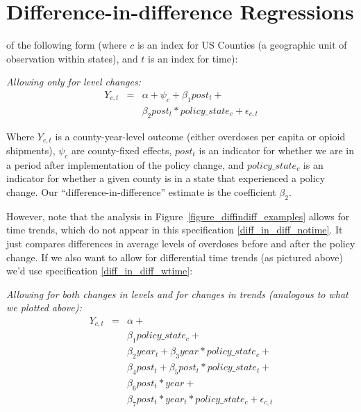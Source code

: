 \documentclass[12pt]{article}
\begin{document}
\appendix

\section{Difference-in-difference Regressions}\label{appendix_diffindiff}

of the following form (where $c$ is an index for US Counties (a geographic unit of observation within states), and $t$ is an index for time):

\emph{Allowing only for level changes:}
\begin{eqnarray}
 Y_{c,t} &=& \alpha + \psi_{c} + \beta_1 post_{t} + \label{diff_in_diff_notime}\\
  && \beta_2 post_{t} * policy\_state_{c} + \epsilon_{c,t} \nonumber
\end{eqnarray}

Where $Y_{c,t}$ is a county-year-level outcome (either overdoses per capita or opioid shipments),  $\psi_c$ are county-fixed effects, $post_{t}$ is an indicator for whether we are in a period after implementation of the policy change, and $policy\_state_{c}$ is an indicator for whether a given county is in a state that experienced a policy change. Our ``difference-in-difference'' estimate is the coefficient $\beta_2$.

However, note that the analysis in Figure~\ref{figure_diffindiff_examples} allows for time trends, which do not appear in this specification \ref{diff_in_diff_notime}. It just compares differences in average levels of overdoses before and after the policy change. If we also want to allow for differential time trends (as pictured above) we'd use specification \ref{diff_in_diff_wtime}:

\emph{Allowing for both changes in levels and for changes in trends (analogous to what we plotted above):}
\begin{eqnarray}
 Y_{c,t} &=& \alpha + \label{diff_in_diff_wtime}\\
 && \beta_1 policy\_state_{c} + \nonumber\\
 && \beta_2 year_{t} + \beta_3 year * policy\_state_{c} + \nonumber\\
 && \beta_4 post_{t} + \beta_5 post_{t} * policy\_state_{t} + \nonumber \\
 && \beta_6 post_{t} * year + \nonumber\\
 && \beta_7 post_{t} * year_{t} * policy\_state_{c} + \epsilon_{c,t} \nonumber
\end{eqnarray}
\end{document}
